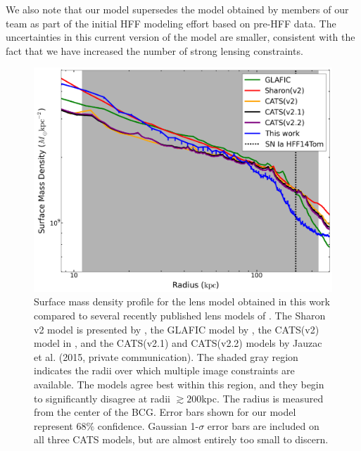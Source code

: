 We also note that our model supersedes the model obtained by members
of our team as part of the initial HFF modeling effort based on
pre-HFF data. The uncertainties in this current version of the model
are smaller, consistent with the fact that we have increased
the number of strong lensing constraints.



%

\begin{figure}
    \centering
    \includegraphics[width=\textwidth]{fig/surface_mass_density_profile.pdf}
    \caption[Surface mass density profile of our lens model.]{Surface mass density profile for the lens model obtained in this work compared to several recently published lens 
        models of \cler. The Sharon v2 model is presented by \citet{Joh++14}, the GLAFIC model by \citet{Ish++15}, the CATS(v2) 
        model in \citet{2014arXiv1409.8663J}, and the CATS(v2.1) and CATS(v2.2) models by Jauzac et al. (2015, private 
        communication).  The shaded gray region indicates the radii over which multiple image constraints are available. The 
        models agree best within this region, and they begin to significantly disagree at radii $\gtrsim 200$kpc. The radius is 
        measured from the center of the BCG. Error bars shown for our model represent $68\%$ confidence. Gaussian 1-$\sigma$ error 
        bars are included on all three CATS models, but are almost entirely too small to discern.
\label{fig:surfcompare}}
\end{figure}


